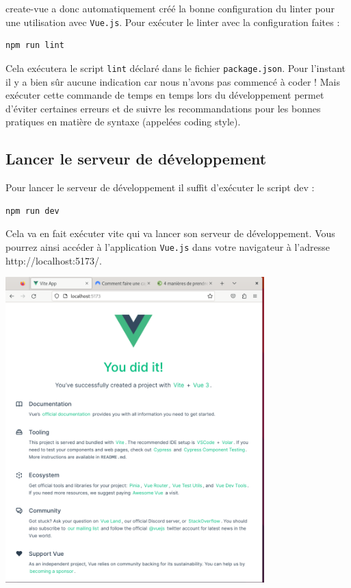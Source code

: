 {\color{monOrange} create-vue} a donc automatiquement créé la bonne configuration du linter pour une utilisation avec {\tt Vue.js}. Pour exécuter le linter avec la configuration faites :

\begin{verbatim}
npm run lint
\end{verbatim}     

Cela exécutera le script {\tt lint} déclaré dans le fichier {\tt package.json}. Pour l'instant il y a bien sûr aucune indication car nous n'avons pas commencé à coder ! Mais exécuter cette commande de temps en temps lors du développement permet d'éviter certaines erreurs et de suivre les recommandations pour les bonnes pratiques en matière de syntaxe (appelées coding style).

\subsection{Lancer le serveur de développement}
Pour lancer le serveur de développement il suffit d'exécuter le script dev :
\begin{verbatim}
npm run dev
\end{verbatim} 

Cela va en fait exécuter {\color{monOrange}vite} qui va lancer son serveur de développement. Vous pourrez ainsi accéder à l'application {\tt Vue.js} dans votre navigateur à l'adresse {\color{monOrange} http://localhost:5173/}.

\begin{center}
\includegraphics[width=10cm]{images/image13.png}
\end{center}

